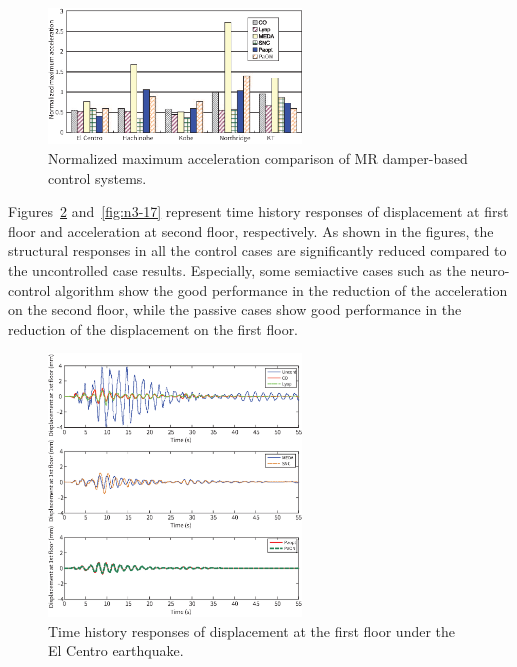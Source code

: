 \begin{figure}[!ht]
\centering
\includegraphics[width=0.6\textwidth] {figure/n3-15.eps}
\caption{Normalized maximum acceleration comparison of MR damper-based control systems.}
\label{fig:n3-15}
\end{figure}

Figures~\ref{fig:n3-16} and~\ref{fig:n3-17} represent time history responses of displacement at first floor and acceleration at second floor, respectively. As shown in the figures, the structural responses in all the control cases are significantly reduced compared to the uncontrolled case results. Especially, some semiactive cases such as the neuro-control algorithm show the good performance in the reduction of the acceleration on the second floor, while the passive cases show good performance in the reduction of the displacement on the first floor.

\begin{figure}[!ht]
\centering
\includegraphics[width=0.6\textwidth] {figure/n3-16.eps}
\caption{Time history responses of displacement at the first floor under the El Centro earthquake.}
\label{fig:n3-16}
\end{figure}

